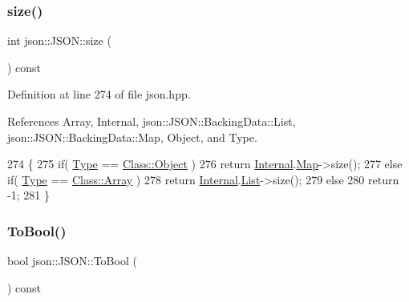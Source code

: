 \subsubsection{\texorpdfstring{size()}{size()}}
{\footnotesize\ttfamily int json\+::\+J\+S\+O\+N\+::size (\begin{DoxyParamCaption}{ }\end{DoxyParamCaption}) const\hspace{0.3cm}{\ttfamily [inline]}}



Definition at line 274 of file json.\+hpp.



References Array, Internal, json\+::\+J\+S\+O\+N\+::\+Backing\+Data\+::\+List, json\+::\+J\+S\+O\+N\+::\+Backing\+Data\+::\+Map, Object, and Type.


\begin{DoxyCode}
274                          \{
275             \textcolor{keywordflow}{if}( \mbox{\hyperlink{classjson_1_1_j_s_o_n_a3fa6923afa41bdfe38077fbc0079aaf5}{Type}} == \mbox{\hyperlink{classjson_1_1_j_s_o_n_a762f55df6d407c1af61607ed516ffe07a497031794414a552435f90151ac3b54b}{Class::Object}} )
276                 \textcolor{keywordflow}{return} \mbox{\hyperlink{classjson_1_1_j_s_o_n_a1e2a064794c3d55c8bb8887fc5734947}{Internal}}.\mbox{\hyperlink{unionjson_1_1_j_s_o_n_1_1_backing_data_ab2e19b00745b37d2add157ff3a35c431}{Map}}->size();
277             \textcolor{keywordflow}{else} \textcolor{keywordflow}{if}( \mbox{\hyperlink{classjson_1_1_j_s_o_n_a3fa6923afa41bdfe38077fbc0079aaf5}{Type}} == \mbox{\hyperlink{classjson_1_1_j_s_o_n_a762f55df6d407c1af61607ed516ffe07a4410ec34d9e6c1a68100ca0ce033fb17}{Class::Array}} )
278                 \textcolor{keywordflow}{return} \mbox{\hyperlink{classjson_1_1_j_s_o_n_a1e2a064794c3d55c8bb8887fc5734947}{Internal}}.\mbox{\hyperlink{unionjson_1_1_j_s_o_n_1_1_backing_data_ab85f5e7ad21f9f7a5407ab73128a3ebc}{List}}->size();
279             \textcolor{keywordflow}{else}
280                 \textcolor{keywordflow}{return} -1;
281         \}
\end{DoxyCode}
\mbox{\label{classjson_1_1_j_s_o_n_adb9ab4683ee30055912b47220780de16}} 
\subsubsection{\texorpdfstring{To\+Bool()}{ToBool()}\hspace{0.1cm}{\footnotesize\ttfamily [1/2]}}
{\footnotesize\ttfamily bool json\+::\+J\+S\+O\+N\+::\+To\+Bool (\begin{DoxyParamCaption}{ }\end{DoxyParamCaption}) const\hspace{0.3cm}{\ttfamily [inline]}}




